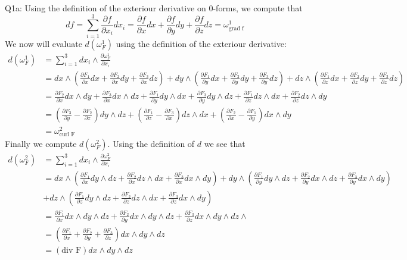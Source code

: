 \documentclass[letterpaper]{article}
\newcommand{\bd}{\partial}
\begin{document}
\noindent Q1a: Using the definition of the exteriour derivative on 0-forms, we compute that 
$$df = \sum_{i=1}^3 \frac{\partial f}{\partial x_i} dx_i = \frac{\partial f}{\partial x}dx+ \frac{\partial f}{\partial y}dy + \frac{\partial f}{\partial z}dz = \omega_{\text{grad f}}^1$$
We now will evaluate $d(\omega_{F}^1)$ using the definition of the exteriour derivative: 
\begin{align*} 
d(\omega_F^1)  &= \sum_{i=1}^3 dx_i \wedge \frac{\partial \omega_F^1}{\partial x_i}
\\ & = dx \wedge (\frac{\partial F_1}{\partial x}dx + \frac{\partial F_2}{\partial x}dy + \frac{\partial F_3}{\partial x}dz) + dy \wedge (\frac{\partial F_1}{\partial y}dx + \frac{\partial F_2}{\partial y}dy + \frac{\partial F_3}{\partial y}dz) + dz \wedge (\frac{\partial F_1}{\partial z}dx + \frac{\partial F_2}{\partial z}dy + \frac{\partial F_3}{\partial z}dz)
\\ & = \frac{\partial F_2}{\partial x} dx \wedge dy + \frac{\partial F_3}{\partial x} dx\wedge dz + \frac{\partial F_1}{\partial y}dy \wedge dx + \frac{\partial F_3}{\partial y}dy \wedge dz + \frac{\partial F_1}{\partial z}dz \wedge dx + \frac{\partial F_2}{\partial z}dz \wedge dy
\\ & = (\frac{\partial F_3}{\partial y} - \frac{\partial F_2}{\partial z})dy \wedge dz + (\frac{\partial F_1}{\partial z} - \frac{\partial F_3}{\partial x})dz \wedge dx + (\frac{\partial F_2}{\partial x} - \frac{\partial F_1}{\partial y})dx \wedge dy
\\ & = \omega_{\text{curl F}}^2
\end{align*}
Finally we compute $d(\omega_F^2)$. Using the definition of $d$ we see that 
\begin{align*}
d(\omega_F^2) & = \sum_{i=1}^3 dx_i \wedge \frac{\bd \omega_F^2}{\bd x_i} 
\\ & =  dx \wedge (\frac{\bd F_1}{\bd x} dy\wedge dz + \frac{\bd F_2}{\bd x} dz \wedge dx + \frac{\bd F_3}{\bd x} dx \wedge dy) + dy\wedge (\frac{\bd F_1}{\bd y}dy \wedge dz + \frac{\bd F_2}{\bd y}dx \wedge dz + \frac{\bd F_3}{\bd y}dx \wedge dy)
\\ & + dz\wedge(\frac{\bd F_1}{\bd z}dy \wedge dz + \frac{\bd F_2}{\bd z}dz \wedge dx + \frac{\bd F_3}{\bd z}dx \wedge dy )
\\ & = \frac{\bd F_1}{\bd x}dx \wedge dy \wedge dz + \frac{\bd F_2}{\bd y} dx \wedge dy \wedge dz + \frac{\bd F_3}{\bd z}dx \wedge dy \wedge dz\wedge
\\ & = (\frac{\bd F_1}{\bd x} + \frac{\bd F_2}{\bd y} + \frac{\bd F_3}{\bd z})dx\wedge dy \wedge dz
\\ & = (\text{div F})dx \wedge dy \wedge dz
\end{align*}
\end{document}
